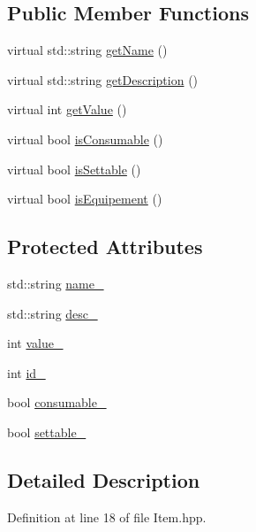 \subsection*{Public Member Functions}
\begin{DoxyCompactItemize}
\item 
virtual std\-::string \hyperlink{class_item_a63d7f2148b699e539aae354b01559811}{get\-Name} ()
\item 
virtual std\-::string \hyperlink{class_item_a407feeebb6390cc6159920b06e52bcc6}{get\-Description} ()
\item 
virtual int \hyperlink{class_item_a9ceb9a0df0efe18d23e347471f908be7}{get\-Value} ()
\item 
virtual bool \hyperlink{class_item_a44942a9e006dabe24cf800c7206f7716}{is\-Consumable} ()
\item 
virtual bool \hyperlink{class_item_a4b6ebdced0c34d42adb47db18c01190e}{is\-Settable} ()
\item 
virtual bool \hyperlink{class_item_af96f73e5721092411458cea3e93c2057}{is\-Equipement} ()
\end{DoxyCompactItemize}
\subsection*{Protected Attributes}
\begin{DoxyCompactItemize}
\item 
std\-::string \hyperlink{class_item_a5ea323338976e43c1b0e6030f641c9d2}{name\-\_\-}
\item 
std\-::string \hyperlink{class_item_acf30d82ad77e65a0ff0b1f3f1efa8660}{desc\-\_\-}
\item 
int \hyperlink{class_item_aab4eafdc2cc91135a58cd5451af637b3}{value\-\_\-}
\item 
int \hyperlink{class_item_acc4aa0295360f0b035b75cebfa81070a}{id\-\_\-}
\item 
bool \hyperlink{class_item_a3b4e5d71b0d2f5b87598b4a9d9b4c0f0}{consumable\-\_\-}
\item 
bool \hyperlink{class_item_aaca10d54d0fa6e1e090766b81c4a60c9}{settable\-\_\-}
\end{DoxyCompactItemize}


\subsection{Detailed Description}


Definition at line 18 of file Item.\-hpp.



